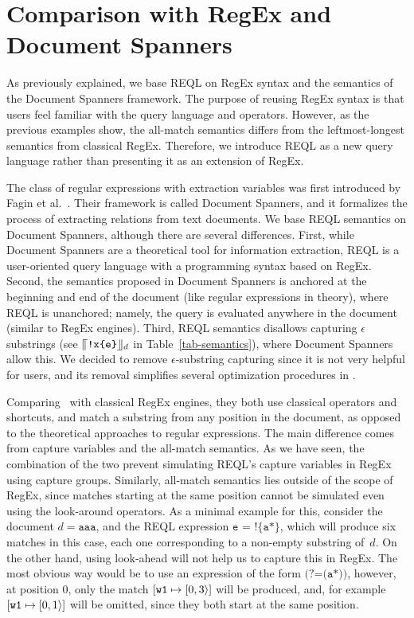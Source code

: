 \section{Comparison with RegEx and Document Spanners} 
As previously explained, we base REQL on RegEx syntax and the semantics of the Document Spanners framework. The purpose of reusing RegEx syntax is that users feel familiar with the query language and operators. However, as the previous examples show, the all-match semantics differs from the leftmost-longest semantics from classical RegEx. Therefore, we introduce REQL as a new query language rather than presenting it as an extension of RegEx. 

The class of regular expressions with extraction variables was first introduced by Fagin et al.~\cite{FaginKRV15}. Their framework is called Document Spanners, and it formalizes the process of extracting relations from text documents. We base REQL semantics on Document Spanners, although there are several differences. First, while Document Spanners are a theoretical tool for information extraction, REQL is a user-oriented query language with a programming syntax based on RegEx. Second, the semantics proposed in Document Spanners is anchored at the beginning and end of the document (like regular expressions in theory), where REQL is unanchored; namely, the query is evaluated anywhere in the document (similar to RegEx engines). Third, REQL semantics disallows capturing $\epsilon$ substrings (see $\llceil{\texttt{!x\{e\}}}\rrfloor_{d}$ in Table~\ref{tab-semantics}), where Document Spanners allow this. %
We decided to remove $\epsilon$-substring capturing since it is not very helpful for users, and its removal simplifies several optimization procedures in \rematch.

Comparing \rematch\ with classical RegEx engines, they both use classical operators and shortcuts, and  match a substring from any position in the document, as opposed to the theoretical approaches to regular expressions. The main difference comes from capture variables and the all-match semantics. As we have seen, the combination of the two prevent simulating REQL's capture variables in RegEx using capture groups. Similarly, all-match semantics lies outside of the scope of RegEx, since matches starting at the same position cannot be simulated even using the look-around operators. As a minimal example for this, consider the document $d = \texttt{aaa}$, and the REQL expression $\texttt{e = !\{a*\}}$, which will produce six matches in this case, each one corresponding to a non-empty substring of~$d$. On the other hand, using look-ahead will not help us to capture this in RegEx. The most obvious way would be to use an expression of the form $\texttt{(?=(a*))}$, however, at position 0, only the match $[\texttt{w1} \mapsto [0, 3\rangle]$ will be produced, and, for example $[\texttt{w1} \mapsto [0, 1\rangle]$ will be omitted, since they both start at the same position.

